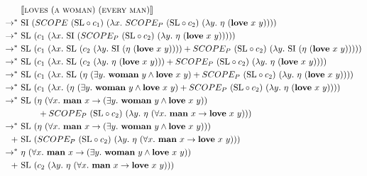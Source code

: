 \begin{align*}
  & \sem{\abs{loves}\ (\abs{a}\ \abs{woman})\ (\abs{every}\ \abs{man})} \\
  \rightarrow^*\ & \mathrm{SI}\ (SCOPE\ (\mathrm{SL} \circ c_1)\ 
  (\lambda x.\ SCOPE_P\ (\mathrm{SL} \circ c_2)\
  (\lambda y.\ \eta\ (\obj{love}\ x\ y)))) \\
  \rightarrow^*\ & \mathrm{SL}\ (c_1\
  (\lambda x.\ \mathrm{SI}\ (SCOPE_P\ (\mathrm{SL} \circ c_2)\
  (\lambda y.\ \eta\ (\obj{love}\ x\ y))))) \\
  \rightarrow^*\ & \mathrm{SL}\ (c_1\
  (\lambda x.\ \mathrm{SL}\ (c_2\ 
  (\lambda y.\ \mathrm{SI}\ (\eta\ (\obj{love}\ x\ y)))) +
  SCOPE_P\ (\mathrm{SL} \circ c_2)\
  (\lambda y.\ \mathrm{SI}\ (\eta\ (\obj{love}\ x\ y))))) \\
  \rightarrow^*\ & \mathrm{SL}\ (c_1\
  (\lambda x.\ \mathrm{SL}\ (c_2\ 
  (\lambda y.\ \eta\ (\obj{love}\ x\ y))) +
  SCOPE_P\ (\mathrm{SL} \circ c_2)\
  (\lambda y.\ \eta\ (\obj{love}\ x\ y)))) \\
  \rightarrow^*\ & \mathrm{SL}\ (c_1\ (\lambda x.\ 
  \mathrm{SL}\ (\eta\ (\exists y.\ \obj{woman}\ y \land \obj{love}\ x\ y) +
  SCOPE_P\ (\mathrm{SL} \circ c_2)\
  (\lambda y.\ \eta\ (\obj{love}\ x\ y)))) \\
  \rightarrow^*\ & \mathrm{SL}\ (c_1\ (\lambda x.\ 
  (\eta\ (\exists y.\ \obj{woman}\ y \land \obj{love}\ x\ y) +
  SCOPE_P\ (\mathrm{SL} \circ c_2)\
  (\lambda y.\ \eta\ (\obj{love}\ x\ y)))) \\
  \rightarrow^*\ & \mathrm{SL}\ (\eta\ (\forall x.\ \obj{man}\ x
  \rightarrow (\exists y.\ \obj{woman}\ y \land \obj{love}\ x\ y)) \\
  & \hspace{7mm} + SCOPE_P\ (\mathrm{SL} \circ c_2)\ (\lambda y.\ 
  \eta\ (\forall x.\ \obj{man}\ x \rightarrow \obj{love}\ x\ y))) \\
  \rightarrow^*\ & \mathrm{SL}\ (\eta\ (\forall x.\ \obj{man}\ x
  \rightarrow (\exists y.\ \obj{woman}\ y \land \obj{love}\ x\ y))) \\
  +\ & \mathrm{SL}\ (SCOPE_P\ (\mathrm{SL} \circ c_2)\ (\lambda y.\
  \eta\ (\forall x.\ \obj{man}\ x \rightarrow \obj{love}\ x\ y))) \\
  \rightarrow^*\ & \eta\ (\forall x.\ \obj{man}\ x
  \rightarrow (\exists y.\ \obj{woman}\ y \land \obj{love}\ x\ y)) \\
  +\ & \mathrm{SL}\ (c_2\ (\lambda y.\ \eta\ (\forall x.\
  \obj{man}\ x \rightarrow \obj{love}\ x\ y))) \\

\end{align*}

